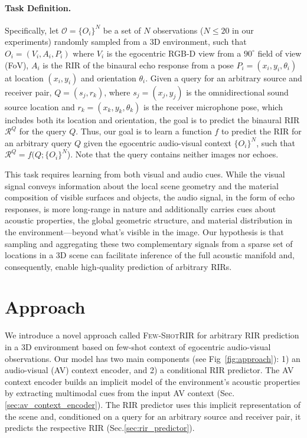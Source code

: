 \paragraph{Task Definition.} Specifically, let $\mathcal{O}=\{O_i\}^N$ be a set of $N$ observations ($N\leq20$ in our experiments) randomly sampled from a 3D environment, such that $O_i=(V_i, A_i, P_i)$ where $V_i$ is the egocentric RGB-D view from a $90^{\circ}$ field of view (FoV), $A_i$ is the RIR of the binaural echo response from a pose $P_i=(x_i, y_i, \theta_i)$ at location $(x_i, y_i)$ and orientation $\theta_i$. Given a query for an arbitrary source and receiver pair, $Q=(s_j, r_k)$, where $s_j=(x_j, y_j)$ is the omnidirectional sound source location and $r_k=(x_k, y_k, \theta_k)$ is the receiver microphone pose, which includes both its location and orientation, the goal is to predict the binaural RIR $\mathcal{R}^Q$ for the query $Q$. Thus, our goal is to learn a function $f$ to predict the RIR for an arbitrary query $Q$ given the egocentric audio-visual context $\{O_i\}^N$, such that $\mathcal{R}^Q = f(Q; \{O_i\}^N$).  Note that the query contains neither images nor echoes.

This task requires learning from both visual and audio cues. While the visual signal conveys information about the local scene geometry and the material composition of visible surfaces and objects, the audio signal, in the form of echo responses, is more long-range in nature and additionally carries cues about acoustic properties, the global geometric structure, and material distribution in the environment---beyond what's visible in the image. Our hypothesis is that sampling and aggregating these two complementary signals from a sparse set of locations in a 3D scene can facilitate inference of the full acoustic manifold and, consequently, enable high-quality prediction of arbitrary RIRs. 

\section{Approach}

We introduce a novel approach called \textsc{Few-ShotRIR}  for arbitrary RIR prediction in a 3D environment based on few-shot context of egocentric audio-visual observations. Our model has two main components (see Fig~\ref{fig:approach}): 1) an audio-visual (AV) context encoder, and 2) a conditional RIR predictor. The  AV context encoder builds an implicit model of the environment's acoustic properties by extracting multimodal cues from the input AV context (Sec.\ref{sec:av_context_encoder}). The RIR predictor uses this implicit representation of the scene and, conditioned on a query for an arbitrary source and receiver pair, it predicts the respective RIR (Sec.\ref{sec:rir_predictor}).

